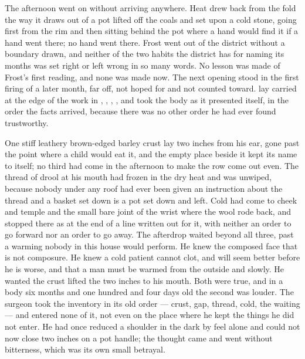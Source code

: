 The afternoon went on without arriving anywhere. Heat drew back from the fold the way it draws out of a pot lifted off the coals and set upon a cold stone, going first from the rim and then sitting behind the pot where a hand would find it if a hand went there; no hand went there. Frost went out of the district without a boundary drawn, and neither of the two habits the district has for naming its months was set right or left wrong in so many words. No lesson was made of Frost's first reading, and none was made now. The next opening stood in the first firing of a later month, far off, not hoped for and not counted toward.  lay carried at the edge of the work in , , , , and took the body as it presented itself, in the order the facts arrived, because there was no other order he had ever found trustworthy.

One stiff leathery brown-edged barley crust lay two inches from his ear, gone past the point where a child would eat it, and the empty place beside it kept its name to itself; no third had come in the afternoon to make the row come out even. The thread of drool at his mouth had frozen in the dry heat and was unwiped, because nobody under any roof had ever been given an instruction about the thread and a basket set down is a pot set down and left. Cold had come to cheek and temple and the small bare joint of the wrist where the wool rode back, and stopped there as at the end of a line written out for it, with neither an order to go forward nor an order to go away. The afterdrop waited beyond all three, past a warming nobody in this house would perform. He knew the composed face that is not composure. He knew a cold patient cannot clot, and will seem better before he is worse, and that a man must be warmed from the outside and slowly. He wanted the crust lifted the two inches to his mouth. Both were true, and in a body six months and one hundred and four days old the second was louder. The surgeon took the inventory in its old order --- crust, gap, thread, cold, the waiting --- and entered none of it, not even on the place where he kept the things he did not enter. He had once reduced a shoulder in the dark by feel alone and could not now close two inches on a pot handle; the thought came and went without bitterness, which was its own small betrayal.

